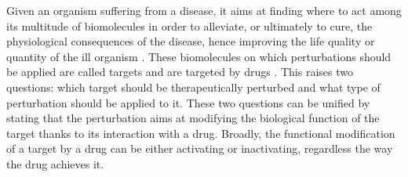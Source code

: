\documentclass[oneside,a4paper,onecolumn,notitlepage,final]{article}
\begin{document}
Given an organism suffering from a disease, it aims at finding where to act among its multitude of biomolecules in order to alleviate, or ultimately to cure, the physiological consequences of the disease, hence improving the life quality or quantity of the ill organism \cite{knowles2003target}. These biomolecules on which perturbations should be applied are called targets and are targeted by drugs \cite{imming2006drugs}. This raises two questions: which target should be therapeutically perturbed and what type of perturbation should be applied to it. These two questions can be unified by stating that the perturbation aims at modifying the biological function of the target thanks to its interaction with a drug. Broadly, the functional modification of a target by a drug can be either activating or inactivating, regardless the way the drug achieves it.
\end{document}
